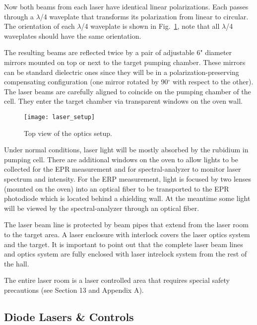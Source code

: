 {Now both beams from each laser have identical linear
polarizations.  Each passes through a $\lambda$/4 waveplate that
transforms its polarization from linear to circular.  The orientation of 
each $\lambda$/4 waveplate is shown in Fig.~\ref{fig:laser_setup}, note that 
all $\lambda$/4 waveplates should have the same orientation.

The resulting beams are reflected twice by a
pair of adjustable 6" diameter mirrors mounted on top or
next to the target pumping chamber. These mirrors can be
standard dielectric ones since they will be in a
polarization-preserving compensating configuration (one mirror rotated
by 90$^\circ$ with respect to the other). 
The laser beams are carefully aligned to coincide on the pumping chamber 
of the cell.  They enter the target chamber via transparent
windows on the oven wall.
  

\begin{figure}
\begin{center}
\centerline{\texttt{[image: laser\_setup]}}
\end{center}
\caption[Top view of the optics setup]%
{Top view of the optics setup.}
\label{fig:laser_setup}
\end{figure}

Under normal conditions, laser light
will be mostly absorbed by the rubidium in pumping cell.
There are additional windows on the oven to allow lights to be
collected for the EPR measurement and for spectral-analyzer to monitor
laser spectrum and intensity.  
For the ERP measurement, light is focused by two lenses (mounted on the oven) 
into an optical fiber to be transported to 
the EPR photodiode which is located behind a shielding wall.
At the meantime some light will be viewed 
by the spectral-analyzer through an optical fiber.

The laser beam line is
protected by beam pipes that extend from the laser room to the target
area. A laser enclosure with interlock covers the laser optics system and 
the target. It is important to point out that the complete laser beam lines 
and optics system are fully enclosed with laser intrelock system from the 
rest of the hall.

\begin{safetyen}{10}{5}
The entire laser room is a laser controlled area that requires special
safety precautions (see Section 13 and Appendix A).
\end{safetyen}

\subsection{Diode Lasers \& Controls}

}
